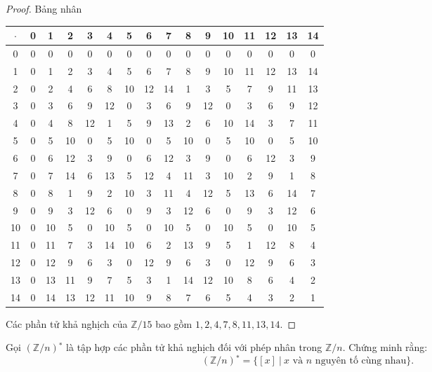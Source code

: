 \documentclass[class=linearalgebra,crop=false]{standalone}
\begin{document}
\begin{proof}
    \par Bảng nhân
    \\
    \begin{tabular}{c|ccccccccccccccc}
        $\cdot$ & 0 & 1 & 2 & 3 & 4 & 5 & 6 & 7 & 8 & 9 & 10 & 11 & 12 & 13 & 14 \\
        \hline
        0 & 0 & 0 & 0 & 0 & 0 & 0 & 0 & 0 & 0 & 0 & 0 & 0 & 0 & 0 & 0 \\
        1 & 0 & 1 & 2 & 3 & 4 & 5 & 6 & 7 & 8 & 9 & 10 & 11 & 12 & 13 & 14 \\
        2 & 0 & 2 & 4 & 6 & 8 & 10 & 12 & 14 & 1 & 3 & 5 & 7 & 9 & 11 & 13 \\
        3 & 0 & 3 & 6 & 9 & 12 & 0 & 3 & 6 & 9 & 12 & 0 & 3 & 6 & 9 & 12 \\
        4 & 0 & 4 & 8 & 12 & 1 & 5 & 9 & 13 & 2 & 6 & 10 & 14 & 3 & 7 & 11 \\
        5 & 0 & 5 & 10 & 0 & 5 & 10 & 0 & 5 & 10 & 0 & 5 & 10 & 0 & 5 & 10 \\
        6 & 0 & 6 & 12 & 3 & 9 & 0 & 6 & 12 & 3 & 9 & 0 & 6 & 12 & 3 & 9 \\
        7 & 0 & 7 & 14 & 6 & 13 & 5 & 12 & 4 & 11 & 3 & 10 & 2 & 9 & 1 & 8 \\
        8 & 0 & 8 & 1 & 9 & 2 & 10 & 3 & 11 & 4 & 12 & 5 & 13 & 6 & 14 & 7 \\
        9 & 0 & 9 & 3 & 12 & 6 & 0 & 9 & 3 & 12 & 6 & 0 & 9 & 3 & 12 & 6 \\
        10 & 0 & 10 & 5 & 0 & 10 & 5 & 0 & 10 & 5 & 0 & 10 & 5 & 0 & 10 & 5 \\
        11 & 0 & 11 & 7 & 3 & 14 & 10 & 6 & 2 & 13 & 9 & 5 & 1 & 12 & 8 & 4 \\
        12 & 0 & 12 & 9 & 6 & 3 & 0 & 12 & 9 & 6 & 3 & 0 & 12 & 9 & 6 & 3 \\
        13 & 0 & 13 & 11 & 9 & 7 & 5 & 3 & 1 & 14 & 12 & 10 & 8 & 6 & 4 & 2 \\
        14 & 0 & 14 & 13 & 12 & 11 & 10 & 9 & 8 & 7 & 6 & 5 & 4 & 3 & 2 & 1
    \end{tabular}

    \bigskip
    \par Các phần tử khả nghịch của $\mathbb{Z}/15$ bao gồm $1, 2, 4, 7, 8, 11, 13, 14$.
\end{proof}

\begin{exercise}Gọi $(\mathbb{Z}/n){}^{*}$ là tập hợp các phần tử khả nghịch đối với phép nhân trong $\mathbb{Z}/n$. Chứng minh rằng:
    \[ (\mathbb{Z}/n){}^{*} = \{ [x]\ |\ \text{$x$ và $n$ nguyên tố cùng nhau} \}. \]
\end{exercise}
\end{document}
